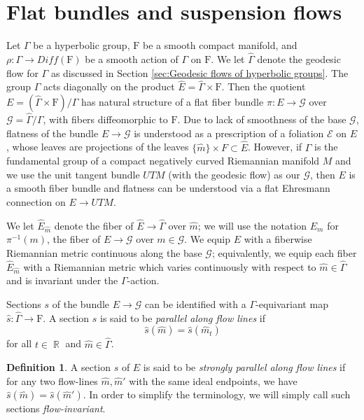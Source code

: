 \documentclass[12pt]{amsbook}%
\theoremstyle{definition}
\newtheorem{defi}[thm]{Definition}
\theoremstyle{remark}
\numberwithin{section}{chapter}
\numberwithin{subsection}{section}
\numberwithin{figure}{chapter}
\DeclareMathOperator{\R}{\mathbb{R}}
\def\cE{{\mathscr{E}}}
\def\F{\mathrm{F}}
\def\Ga{\Gamma}
\def\cG{{\mathscr{G}}}
\begin{document}
{{ 
 
\section{Flat bundles and suspension flows}\label{sec:flat bundles}



Let $\Ga$ be a hyperbolic group, $\F$ be a smooth compact manifold, and $\rho: \Ga\to Diff(\F)$ be a smooth 
action of $\Ga$ on $\F$. We let $\widehat\Ga$ denote the geodesic flow for $\Ga$ as discussed in Section \ref{sec:Geodesic flows of hyperbolic groups}. 
The group $\Ga$ acts diagonally on the product $\widehat{E}=\widehat\Ga\times \F$. 
Then the quotient $E=(\widehat\Ga\times \F)/\Ga$ has natural structure of a flat 
fiber bundle $\pi: E\to \cG$ over $\cG=\widehat\Ga/\Ga$, with fibers diffeomorphic to $\F$. Due to lack of smoothness of the base $\cG$, flatness of the 
bundle $E\to \cG$ is understood as a prescription of a  foliation $\cE$ on $E$, whose leaves are projections of the leaves 
$\{\hat{m}\}\times F\subset \widehat E$. However, if $\Ga$ is the fundamental group of a compact negatively curved Riemannian manifold $M$ and we use the unit tangent bundle $UTM$ (with the geodesic flow) as our $\cG$, then $E$ is a smooth fiber bundle and flatness can be understood via a flat Ehresmann connection on $E\to UTM$. 

We let $\widehat{E}_{{\hat m}}$ denote 
the fiber of $\widehat{E}\to \widehat\Ga$ over $\hat{m}$; we will use  the notation $E_{m}$ for $\pi^{-1}(m)$, 
the fiber of $E\to \cG$ over $m\in \cG$.     
We equip $E$ with a fiberwise Riemannian metric continuous along the base 
$\cG$; equivalently, we equip each fiber $\widehat{E}_{{\hat m}}$ 
with a Riemannian metric which varies continuously with respect to ${\hat m} \in \widehat{\Ga}$ 
and is invariant under the $\Ga$-action. 

Sections $s$ of the bundle $E\to \cG$ can be identified with a $\Ga$-equivariant map  
$\hat{s}: \widehat\Ga\to \F$.  A section $s$  is said to be {\em parallel along flow lines} if 
$$
\hat{s}(\hat m)= \hat{s}(\hat m_t)
$$
for all $t\in \R$ and $\hat{m} \in \widehat\Ga$. 

\begin{defi}
A section $s$ of $E$ is said to be 
{\em strongly parallel along flow lines} if for any two flow-lines 
$\hat m,\hat m'$ with the same ideal endpoints, we have
$\hat{s}(\hat m)=\hat{s}(\hat m')$. In order to simplify the terminology, we will simply call such sections {\em flow-invariant}. 
\end{defi}

}}
\end{document}
